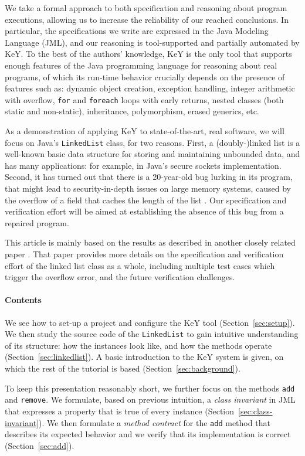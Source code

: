 \documentclass[runningheads]{llncs}
\begin{document}
We take a formal approach to both specification and reasoning about program executions, allowing us to increase the reliability of our reached conclusions. In particular, the specifications we write are expressed in the Java Modeling Language (JML), and our reasoning is tool-supported and partially automated by KeY. To the best of the authors' knowledge, KeY is the only tool that supports enough features of the Java programming language for reasoning about real programs, of which its run-time behavior crucially depends on the presence of features such as: dynamic object creation, exception handling, integer arithmetic with overflow, \texttt{for} and \texttt{foreach} loops with early returns, nested classes (both static and non-static), inheritance, polymorphism, erased generics, etc.

As a demonstration of applying KeY to state-of-the-art, real software, we will focus on Java's \texttt{LinkedList} class, for two reasons. First, a (doubly-)linked list is a well-known basic data structure for storing and maintaining unbounded data, and has many applications: for example, in Java's secure sockets implementation. Second, it has turned out that there is a 20-year-old bug lurking in its program, that might lead to security-in-depth issues on large memory systems, caused by the overflow of a field that caches the length of the list \cite{hiep2019verifying}. Our specification and verification effort will be aimed at establishing the absence of this bug from a repaired program.

This article is mainly based on the results as described in another closely related paper \cite{hiep2019verifying}. That paper provides more details on the specification and verification effort of the linked list class as a whole, including multiple test cases which trigger the overflow error, and the future verification challenges.

\paragraph{Contents}
We see how to set-up a project and configure the KeY tool (Section~\ref{sec:setup}). We then study the source code of the \texttt{LinkedList} to gain intuitive understanding of its structure: how the instances look like, and how the methods operate (Section~\ref{sec:linkedlist}). A basic introduction to the KeY system is given, on which the rest of the tutorial is based (Section~\ref{sec:background}).

To keep this presentation reasonably short, we further focus on the methods \texttt{add} and \texttt{remove}. We formulate, based on previous intuition, a \emph{class invariant} in JML that expresses a property that is true of every instance (Section~\ref{sec:class-invariant}). We then formulate a \emph{method contract} for the \texttt{add} method that describes its expected behavior and we verify that its implementation is correct (Section~\ref{sec:add}).
\end{document}
